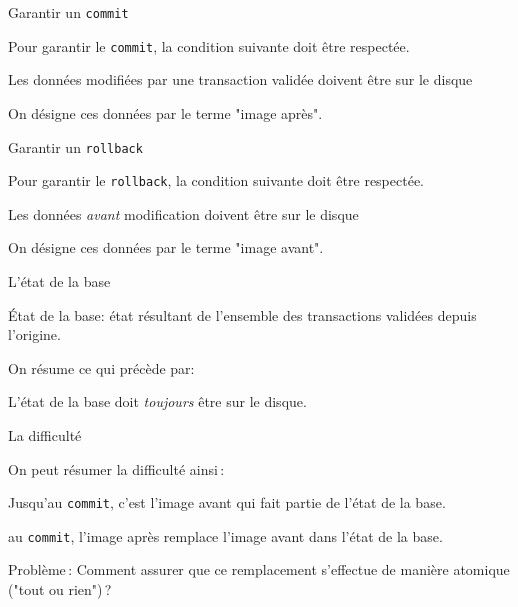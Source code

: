 \documentclass[aspectratio=169, handout]{beamer} %
\begin{document}
\begin{frame}{Garantir un \texttt{commit}}

Pour garantir le \texttt{commit}, la condition suivante doit être respectée.
\vfill

\centerline{\alert{Les données modifiées par une transaction validée doivent
être sur le disque}}

\vfill


On désigne  ces données par le terme "image après".

\end{frame}


\begin{frame}{Garantir un \texttt{rollback}}

Pour garantir le \texttt{rollback}, la condition suivante doit être respectée.
\vfill

\centerline{\alert{Les données \emph{avant} modification doivent
être sur le disque}}

\vfill

On désigne  ces données par le terme "image avant".

\end{frame}

\begin{frame}{L'état de la base}

\alert{\'Etat de la base}: état résultant de l'ensemble des transactions \alert{validées} 
depuis l'origine.

\bigskip

On résume ce qui précède par:

\bigskip

\centerline{\alert{L'état de la base doit \emph{toujours} être sur le disque.}}

\end{frame}


\begin{frame}{La difficulté}


On peut résumer la difficulté ainsi\,:

\vfill

\begin{redbullet}
   \item Jusqu'au \texttt{commit}, c'est \alert{l'image avant} qui 
       fait partie de l'état de la base.
     \item au \texttt{commit},  \alert{l'image après} remplace  \alert{l'image avant}
     dans l'état de la base.
\end{redbullet}

\vfill

\begin{blocgauche}
\alert{Problème}\,: Comment assurer que ce remplacement s'effectue de manière \alert{atomique} ("tout ou rien")\,?

\medskip

\end{blocgauche}

\end{frame}
\end{document}
